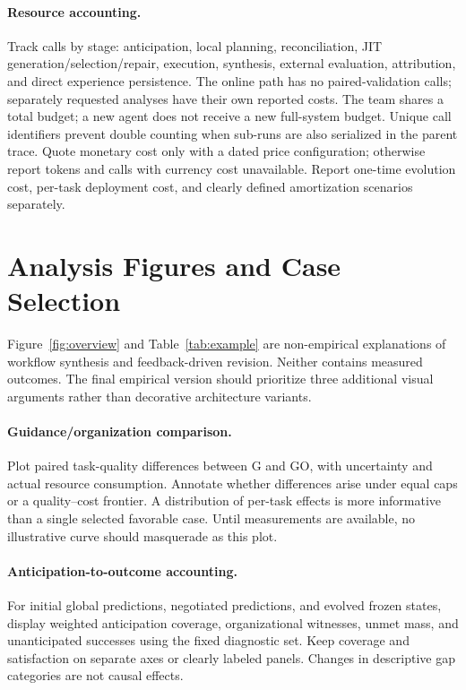 \paragraph{Resource accounting.}
Track calls by stage: anticipation, local planning, reconciliation, JIT generation/selection/repair, execution, synthesis, external evaluation, attribution, and direct experience persistence. The online path has no paired-validation calls; separately requested analyses have their own reported costs. The team shares a total budget; a new agent does not receive a new full-system budget. Unique call identifiers prevent double counting when sub-runs are also serialized in the parent trace. Quote monetary cost only with a dated price configuration; otherwise report tokens and calls with currency cost unavailable. Report one-time evolution cost, per-task deployment cost, and clearly defined amortization scenarios separately.

\section{Analysis Figures and Case Selection}

Figure~\ref{fig:overview} and Table~\ref{tab:example} are non-empirical explanations of workflow synthesis and feedback-driven revision. Neither contains measured outcomes. The final empirical version should prioritize three additional visual arguments rather than decorative architecture variants.

\paragraph{Guidance/organization comparison.}
Plot paired task-quality differences between G and GO, with uncertainty and actual resource consumption. Annotate whether differences arise under equal caps or a quality--cost frontier. A distribution of per-task effects is more informative than a single selected favorable case. Until measurements are available, no illustrative curve should masquerade as this plot.

\paragraph{Anticipation-to-outcome accounting.}
For initial global predictions, negotiated predictions, and evolved frozen states, display weighted anticipation coverage, organizational witnesses, unmet mass, and unanticipated successes using the fixed diagnostic set. Keep coverage and satisfaction on separate axes or clearly labeled panels. Changes in descriptive gap categories are not causal effects.

